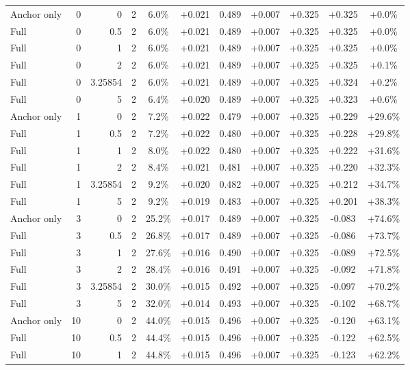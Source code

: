 \begin{table}[htbp]
\begin{tabular}{lrrrccccccc}
Anchor only & 0 & 0 & 2 & 6.0\% & +0.021 & 0.489 & +0.007 & +0.325 & +0.325 & +0.0\% \\
Full & 0 & 0.5 & 2 & 6.0\% & +0.021 & 0.489 & +0.007 & +0.325 & +0.325 & +0.0\% \\
Full & 0 & 1 & 2 & 6.0\% & +0.021 & 0.489 & +0.007 & +0.325 & +0.325 & +0.0\% \\
Full & 0 & 2 & 2 & 6.0\% & +0.021 & 0.489 & +0.007 & +0.325 & +0.325 & +0.1\% \\
Full & 0 & 3.25854 & 2 & 6.0\% & +0.021 & 0.489 & +0.007 & +0.325 & +0.324 & +0.2\% \\
Full & 0 & 5 & 2 & 6.4\% & +0.020 & 0.489 & +0.007 & +0.325 & +0.323 & +0.6\% \\
Anchor only & 1 & 0 & 2 & 7.2\% & +0.022 & 0.479 & +0.007 & +0.325 & +0.229 & +29.6\% \\
Full & 1 & 0.5 & 2 & 7.2\% & +0.022 & 0.480 & +0.007 & +0.325 & +0.228 & +29.8\% \\
Full & 1 & 1 & 2 & 8.0\% & +0.022 & 0.480 & +0.007 & +0.325 & +0.222 & +31.6\% \\
Full & 1 & 2 & 2 & 8.4\% & +0.021 & 0.481 & +0.007 & +0.325 & +0.220 & +32.3\% \\
Full & 1 & 3.25854 & 2 & 9.2\% & +0.020 & 0.482 & +0.007 & +0.325 & +0.212 & +34.7\% \\
Full & 1 & 5 & 2 & 9.2\% & +0.019 & 0.483 & +0.007 & +0.325 & +0.201 & +38.3\% \\
Anchor only & 3 & 0 & 2 & 25.2\% & +0.017 & 0.489 & +0.007 & +0.325 & -0.083 & +74.6\% \\
Full & 3 & 0.5 & 2 & 26.8\% & +0.017 & 0.489 & +0.007 & +0.325 & -0.086 & +73.7\% \\
Full & 3 & 1 & 2 & 27.6\% & +0.016 & 0.490 & +0.007 & +0.325 & -0.089 & +72.5\% \\
Full & 3 & 2 & 2 & 28.4\% & +0.016 & 0.491 & +0.007 & +0.325 & -0.092 & +71.8\% \\
Full & 3 & 3.25854 & 2 & 30.0\% & +0.015 & 0.492 & +0.007 & +0.325 & -0.097 & +70.2\% \\
Full & 3 & 5 & 2 & 32.0\% & +0.014 & 0.493 & +0.007 & +0.325 & -0.102 & +68.7\% \\
Anchor only & 10 & 0 & 2 & 44.0\% & +0.015 & 0.496 & +0.007 & +0.325 & -0.120 & +63.1\% \\
Full & 10 & 0.5 & 2 & 44.4\% & +0.015 & 0.496 & +0.007 & +0.325 & -0.122 & +62.5\% \\
Full & 10 & 1 & 2 & 44.8\% & +0.015 & 0.496 & +0.007 & +0.325 & -0.123 & +62.2\% \\

\end{tabular}
\end{table}
